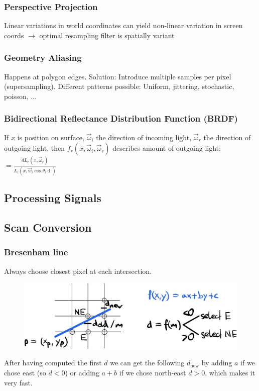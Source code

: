 \documentclass[a4paper,10pt]{article}
\begin{document}
\subsubsection{Perspective Projection} Linear variations in world coordinates can yield non-linear variation in screen coords \( \to  \) optimal resampling filter is spatially variant
\subsubsection{Geometry Aliasing} Happens at polygon edges. Solution: Introduce multiple samples per pixel (supersampling). Different patterns possible: Uniform, jittering, stochastic, poisson, ...

\subsubsection{Bidirectional Reflectance Distribution Function (BRDF)}
If \( x \) is position on surface, \( \vec{\omega}_i \) the direction of incoming light, \( \vec{\omega}_r \) the direction of outgoing light, then \( f_r(x, \vec{\omega}_i, \vec{\omega}_r) \) describes amount of outgoing light:
\( = \frac{dL_r(x, \vec{\omega}_r)}{L_i(x, \vec{w}_i \cos \theta _i \mathop{d\vec{w}_i})} \)

\subsection{Processing Signals}

\subsection{Scan Conversion}
\subsubsection{Bresenham line} Always choose closest pixel at each intersection. 
\begin{figure}[h]
    \center
    \includegraphics[width=0.75\linewidth]{bresenham-line.jpeg}
\end{figure}

After having computed the first \( d \) we can get the following \( d_\text{new} \) by adding \( a \) if we chose east (so \( d < 0 \)) or adding \( a + b \) if we chose north-east \( d > 0 \), which makes it very fast.
\end{document}
